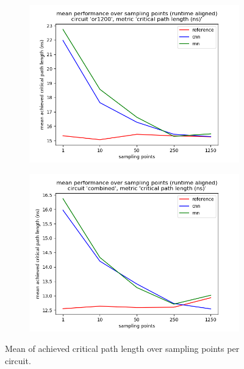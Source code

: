 \begin{figure}[H]
\begin{subfigure}[b]{0.49\linewidth}
		\includegraphics[width=\linewidth]{plots/eval-or1200-critical-path-mean-full.png}
	\end{subfigure}
	\begin{subfigure}[b]{0.49\linewidth}
		\includegraphics[width=\linewidth]{plots/eval-combined-critical-path-mean-full.png}
	\end{subfigure}
	\caption{Mean of achieved critical path length over sampling points per circuit.}
	\label{fig:eval-critical-path-mean}
\end{figure}

